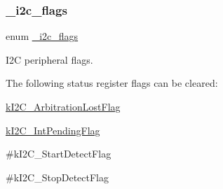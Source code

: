 \subsubsection{\texorpdfstring{\_i2c\_flags}{\_i2c\_flags}}
{\footnotesize\ttfamily enum \mbox{\hyperlink{group__i2c__driver_ga1f1337bbe9d0b184d9dcee31f9ebade2}{\+\_\+i2c\+\_\+flags}}}



I2C peripheral flags. 

The following status register flags can be cleared\+:
\begin{DoxyItemize}
\item \mbox{\hyperlink{group__i2c__driver_gga1f1337bbe9d0b184d9dcee31f9ebade2a39fab5ef04e74d00ef4c4574899ab589}{k\+I2\+C\+\_\+\+Arbitration\+Lost\+Flag}}
\item \mbox{\hyperlink{group__i2c__driver_gga1f1337bbe9d0b184d9dcee31f9ebade2a647d0b1d1f9514ad483bef3ea3926c3b}{k\+I2\+C\+\_\+\+Int\+Pending\+Flag}}
\item \#k\+I2\+C\+\_\+\+Start\+Detect\+Flag
\item \#k\+I2\+C\+\_\+\+Stop\+Detect\+Flag
\end{DoxyItemize}

